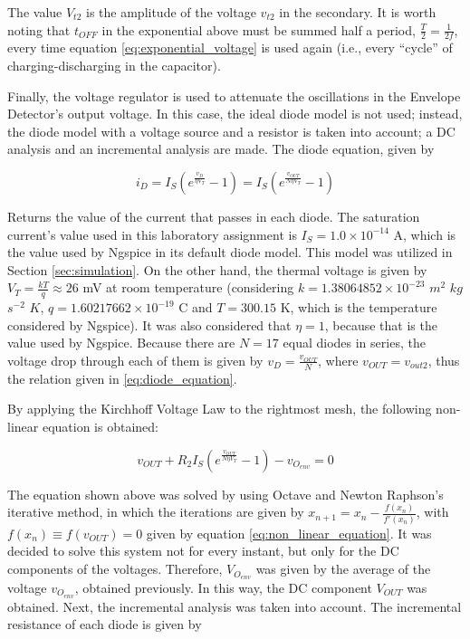 The value $V_{t2}$ is the amplitude of the voltage $v_{t2}$ in the secondary. It is worth noting that $t_{OFF}$ in the exponential above must be summed half a period, $\frac{T}{2}=\frac{1}{2f}$, every time equation \ref{eq:exponential_voltage} is used again (i.e., every ``cycle'' of charging-discharging in the capacitor).

\par

Finally, the voltage regulator is used to attenuate the oscillations in the Envelope Detector's output voltage. In this case, the ideal diode model is not used; instead, the diode model with a voltage source and a resistor is taken into account; a DC analysis and an incremental analysis are made. The diode equation, given by

\begin{equation} \label{eq:diode_equation}
  i_D=I_S\left(e^{\frac{v_D}{\eta V_T}}-1\right)=I_S\left(e^{\frac{v_{OUT}}{N\eta V_T}}-1\right)
\end{equation}

Returns the value of the current that passes in each diode. The saturation current's value used in this laboratory assignment is $I_S=1.0\times10^{-14}$ A, which is the value used by Ngspice in its default diode model. This model was utilized in Section \ref{sec:simulation}. On the other hand, the thermal voltage is given by $V_T=\frac{kT}{q}\approx 26$ mV at room temperature (considering $k=1.38064852\times10^{-23}$ $m^2$ $kg$ $s^{-2}$ $K$, $q=1.60217662\times10^{-19}$ C and $T=300.15$ K, which is the temperature considered by Ngspice). It was also considered that $\eta=1$, because that is the value used by Ngspice. Because there are $N=17$ equal diodes in series, the voltage drop through each of them is given by $v_D=\frac{v_{OUT}}{N}$, where $v_{OUT}=v_{out2}$, thus the relation given in \ref{eq:diode_equation}.
\par
By applying the Kirchhoff Voltage Law to the rightmost mesh, the following non-linear equation is obtained:

\begin{equation} \label{eq:non_linear_equation}
  v_{OUT}+R_2I_S\left(e^{\frac{v_{OUT}}{N\eta V_T}}-1\right)-v_{O_{env}}=0
\end{equation}

The equation shown above was solved by using Octave and Newton Raphson's iterative method, in which the iterations are given by $x_{n+1}=x_{n}-\frac{f(x_n)}{f'(x_n)}$, with $f(x_n)\equiv f(v_{OUT})=0$ given by equation \ref{eq:non_linear_equation}. It was decided to solve this system not for every instant, but only for the DC components of the voltages. Therefore, $V_{O_{env}}$ was given by the average of the voltage $v_{O_{env}}$, obtained previously. In this way, the DC component $V_{OUT}$ was obtained. Next, the incremental analysis was taken into account. The incremental resistance of each diode is given by

